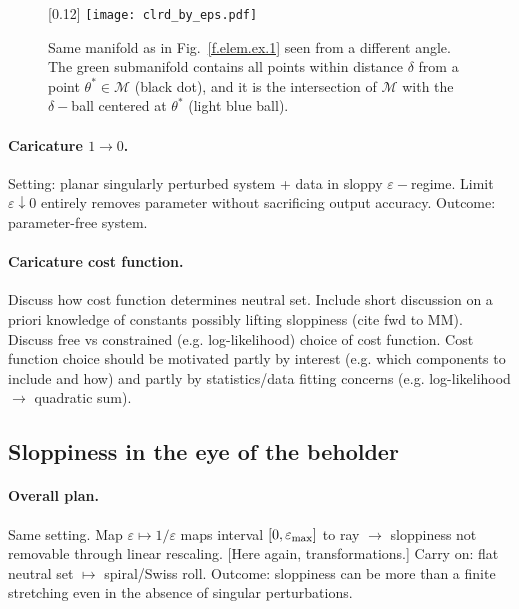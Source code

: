 \documentclass{article}
\newcommand{\M}{\mathcal{M}}
\newcommand{\eps}{\varepsilon}
\newcommand{\p}{\theta}
\newcommand{\omm}{\mathcal{M}}
\begin{document}
%
\begin{figure}[t]
\scalebox{0.24}[0.12]{
\texttt{[image: clrd\_by\_eps.pdf]}
}
\caption{\label{f.elem.ex.2}
Same manifold as in Fig.~\eqref{f.elem.ex.1} seen from a different angle. The green submanifold contains all points within distance $\delta$ from a point $\p^* \in \omm$ (black dot), and it is the intersection of $\M$ with the $\delta-$ball centered at $\p^*$ (light blue ball).}
\end{figure}
%

{\color{gray}\paragraph{Caricature $1 \rightarrow 0$.}
Setting: planar singularly perturbed system + data in sloppy $\eps-$regime.
Limit $\eps \downarrow 0$ entirely removes parameter
without sacrificing output accuracy.
Outcome: parameter-free system.}

\paragraph{Caricature cost function.}
{\color{gray}Discuss how cost function determines neutral set.}
Include short discussion on a priori knowledge of constants
possibly lifting sloppiness (cite fwd to MM).
Discuss free vs constrained (e.g. log-likelihood) choice of cost function.
Cost function choice should be motivated
partly by interest (e.g. which components to include and how)
and partly by statistics/data fitting concerns
(e.g. log-likelihood $\rightarrow$ quadratic sum).


\subsection{Sloppiness in the eye of the beholder}

\paragraph{Overall plan.}
Same setting.  Map $\eps \mapsto 1/\eps$ maps interval
$[0,\eps_{\rm max}]$ to ray $\rightarrow$ sloppiness not removable
through linear rescaling.  [Here again, transformations.]  Carry on:
flat neutral set $\mapsto$ spiral/Swiss roll.  Outcome: sloppiness can
be more than a finite stretching even in the absence of singular
perturbations.\\
\end{document}
